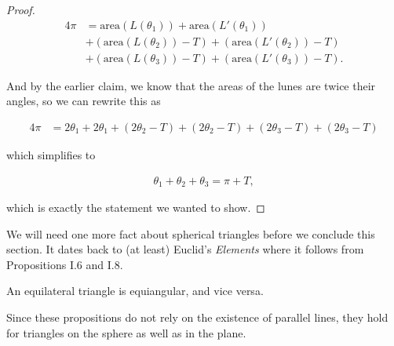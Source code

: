 \begin{proof}
	\begin{align*}
	4\pi &= \mathrm{area}(L(\theta_1)) + \mathrm{area}(L'(\theta_1)) \\
	&+  (\mathrm{area}(L(\theta_2)) - T) + (\mathrm{area}(L'(\theta_2)) - T) \\
	&+ (\mathrm{area}(L(\theta_3)) - T)	 + (\mathrm{area}(L'(\theta_3)) - T).
	\end{align*}
	
	And by the earlier claim, we know that the areas of the lunes are twice their angles, so we can rewrite this as
	
	
	\begin{align*}
	4\pi &= 2\theta_1 + 2\theta_1 
	+  (2\theta_2 - T) + (2\theta_2-T) 
	+ (2\theta_3 - T)	 + (2\theta_3 - T)
	\end{align*}
	
	which simplifies to 
	
	\begin{align*}
	\theta_1+\theta_2+\theta_3 = \pi + T,
	\end{align*}
	
	which is exactly the statement we wanted to show.
\end{proof}

We will need one more fact about spherical triangles before we conclude this section.  It dates back to (at least) Euclid's \textit{Elements} \cite{elements} where it follows from Propositions I.6 and I.8.  

\begin{fact}
	An equilateral triangle is equiangular, and vice versa.
\end{fact}

Since these propositions do not rely on the existence of parallel lines, they hold for triangles on the sphere as well as in the plane.

